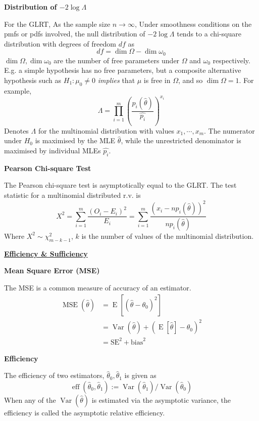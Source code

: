 \documentclass[a4paper]{article}
\newcommand{\heading}[1]{{\small\underline{\textbf{#1}}}\smallskip}
\newcommand{\subheading}[1]{{\scriptsize\textbf{#1}}}
\renewenvironment{section}[1]
  {
    \subheading{#1}

  }{
    \smallskip
  }
\newcommand{\expectation}[1]{\operatorname{E}[#1]}
\DeclareMathOperator{\Var}{Var}
\DeclareMathOperator{\MSE}{MSE}
\DeclareMathOperator{\eff}{eff}
\begin{document}
\begin{multicols*}{4}
\begin{section}{Distribution of $-2\log \Lambda$}
  For the GLRT, As the sample size $n \rightarrow \infty$, Under smoothness
  conditions on the pmfs or pdfs involved, the null distribution of $-2\log
  \Lambda$ tends to a chi-square distribution with degrees of freedom $df$ as
  $$df = \dim \Omega - \dim \omega_0$$
  $\dim \Omega, \dim \omega_0$ are the number of free parameters under $\Omega$
  and $\omega_0$ respectively. E.g. a simple hypothesis has no free parameters,
  but a composite alternative hypothesis such as $H_1: \mu_0 \neq 0$
  \textit{implies} that $\mu$ is free in $\Omega$, and so $\dim \Omega = 1$. For
  example,
  $$\Lambda = \prod^m_{i=1} \left(
    \frac{p_i(\hat{\theta})}{\hat{p_i}}
  \right )^{x_i}$$
  Denotes $\Lambda$ for the multinomial distribution with values $x_1, \cdots,
  x_m$. The numerator under $H_0$ is maximised by the MLE $\hat{\theta}$, while
  the unrestricted denominator is maximised by individual MLEs $\hat{p_i}$.
\end{section}

\begin{section}{Pearson Chi-square Test}
  The Pearson chi-square test is asymptotically equal to the GLRT. The test
  statistic for a multinomial distributed r.v. is
  $$X^2 = \sum^m_{i=1}\frac{(O_i - E_i)^2}{E_i}
    = \sum^m_{i=1} \frac{(x_i - np_i(\hat{\theta}))^2}{np_i(\hat{\theta})}$$
  Where $X^2 \sim \chi^2_{m-k-1}$, $k$ is the number of values of the
  multinomial distribution.
\end{section}

\heading{Efficiency \& Sufficiency}

\begin{section}{Mean Square Error (MSE)}
  The MSE is a common measure of accuracy of an estimator.
  \begin{align*}
    \MSE(\hat{\theta}) &= \expectation{(\hat{\theta}-\theta_0)^2} \\
                       &= \Var(\hat{\theta}) +
                          (\expectation{\hat{\theta}} - \theta_0)^2 \\
                       &= \text{SE}^2 + \text{bias}^2
  \end{align*}
\end{section}

\begin{section}{Efficiency}
  The efficiency of two estimators, $\hat{\theta}_0, \hat{\theta}_1$ is given as
  $$\eff(\hat{\theta}_0, \hat{\theta}_1) :=
    \Var(\hat{\theta}_1)/\Var(\hat{\theta}_0)$$
  When any of the $\Var(\hat{\theta})$ is estimated via the asymptotic variance,
  the efficiency is called the asymptotic relative efficiency.
\end{section}


\end{multicols*}
\end{document}
